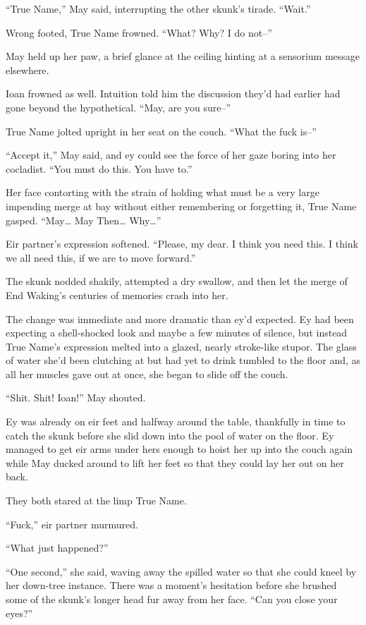 ``True Name,'' May said, interrupting the other skunk's tirade. ``Wait.''

Wrong footed, True Name frowned. ``What? Why? I do not--''

May held up her paw, a brief glance at the ceiling hinting at a sensorium message elsewhere.

Ioan frowned as well. Intuition told him the discussion they'd had earlier had gone beyond the hypothetical. ``May, are you sure--''

True Name jolted upright in her seat on the couch. ``What the fuck is--''

``Accept it,'' May said, and ey could see the force of her gaze boring into her cocladist. ``You must do this. You have to.''

Her face contorting with the strain of holding what must be a very large impending merge at bay without either remembering or forgetting it, True Name gasped. ``May\ldots{} May Then\ldots{} Why\ldots{}''

Eir partner's expression softened. ``Please, my dear. I think you need this. I think we all need this, if we are to move forward.''

The skunk nodded shakily, attempted a dry swallow, and then let the merge of End Waking's centuries of memories crash into her.

The change was immediate and more dramatic than ey'd expected. Ey had been expecting a shell-shocked look and maybe a few minutes of silence, but instead True Name's expression melted into a glazed, nearly stroke-like stupor. The glass of water she'd been clutching at but had yet to drink tumbled to the floor and, as all her muscles gave out at once, she began to slide off the couch.

``Shit. Shit! Ioan!'' May shouted.

Ey was already on eir feet and halfway around the table, thankfully in time to catch the skunk before she slid down into the pool of water on the floor. Ey managed to get eir arms under hers enough to hoist her up into the couch again while May ducked around to lift her feet so that they could lay her out on her back.

They both stared at the limp True Name.

``Fuck,'' eir partner murmured.

``What just happened?''

``One second,'' she said, waving away the spilled water so that she could kneel by her down-tree instance. There was a moment's hesitation before she brushed some of the skunk's longer head fur away from her face. ``Can you close your eyes?''

